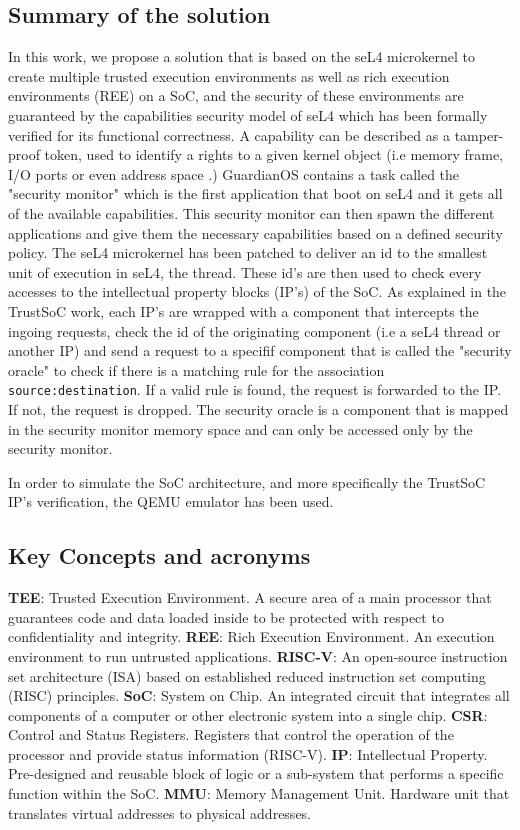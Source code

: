 \documentclass[conference]{IEEEtran}
\begin{document}
\subsection{Summary of the solution}\label{AB}
In this work, we propose a solution that is based on the seL4 microkernel to create multiple trusted execution environments as well as rich execution environments (REE) on a SoC, and the security of these environments are guaranteed by the capabilities security model of seL4 which has been formally verified for its functional correctness. A capability can be described as a tamper-proof token, used to identify a rights to a given kernel object (i.e memory frame, I/O ports or even address space \cite{heiser_sel4_nodate}.) GuardianOS contains a task called the "security monitor" which is the first application that boot on seL4 and it gets all of the available capabilities. This security monitor can then spawn the different applications and give them the necessary capabilities based on a defined security policy. The seL4 microkernel has been patched to deliver an id to the smallest unit of execution in seL4, the thread. These id's are then used to check every accesses to the intellectual property blocks (IP's) of the SoC. As explained in the TrustSoC work, each IP's are wrapped with a component that intercepts the ingoing requests, check the id of the originating component (i.e a seL4 thread or another IP) and send a request to a specifif component that is called the "security oracle" to check if there is a matching rule for the association \texttt{source:destination}. If a valid rule is found, the request is forwarded to the IP. If not, the request is dropped. The security oracle is a component that is mapped in the security monitor memory space and can only be accessed only by the security monitor.

In order to simulate the SoC architecture, and more specifically the TrustSoC IP's verification, the QEMU emulator has been used. 
 

\subsection{Key Concepts and acronyms}
    \textbf{TEE}: Trusted Execution Environment. A secure area of a main processor that guarantees code and data loaded inside to be protected with respect to confidentiality and integrity.
    \textbf{REE}: Rich Execution Environment. An execution environment to run untrusted applications.
    \textbf{RISC-V}: An open-source instruction set architecture (ISA) based on established reduced instruction set computing (RISC) principles.
    \textbf{SoC}: System on Chip. An integrated circuit that integrates all components of a computer or other electronic system into a single chip.
    \textbf{CSR}: Control and Status Registers. Registers that control the operation of the processor and provide status information (RISC-V). 
    \textbf{IP}: Intellectual Property. Pre-designed and reusable block of logic or a sub-system that performs a specific function within the SoC. 
    \textbf{MMU}: Memory Management Unit. Hardware unit that translates virtual addresses to physical addresses. 
\end{document}
